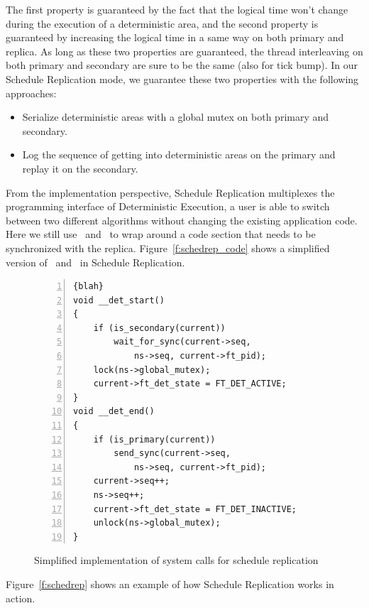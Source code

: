 The first property is guaranteed by the fact that the logical time won't change during the execution of a deterministic area, and the second property is guaranteed by increasing the logical time in a same way on both primary and replica. As long as these two properties are guaranteed, the thread interleaving on both primary and secondary are sure to be the same (also for tick bump). In our Schedule Replication mode, we guarantee these two properties with the following approaches:

\begin{itemize}
\item Serialize deterministic areas with a global mutex on both primary and secondary.
\item Log the sequence of getting into deterministic areas on the primary and replay it on the secondary.
\end{itemize}

From the implementation perspective, Schedule Replication multiplexes the programming interface of Deterministic Execution, a user is able to switch between two different algorithms without changing the existing application code. Here we still use \detstart\ and \detend\ to wrap around a code section that needs to be synchronized with the replica. Figure~\ref{f:schedrep_code} shows a simplified version of \detstart\ and \detend\ in Schedule Replication.

\begin{figure}
\begin{lstlisting}[numbers=left, frame=single, basicstyle=\small, breaklines]{blah}
void __det_start()
{
    if (is_secondary(current))
        wait_for_sync(current->seq, 
            ns->seq, current->ft_pid);
    lock(ns->global_mutex);
    current->ft_det_state = FT_DET_ACTIVE;
}
void __det_end()
{
    if (is_primary(current))
        send_sync(current->seq, 
            ns->seq, current->ft_pid);
    current->seq++;
    ns->seq++;
    current->ft_det_state = FT_DET_INACTIVE;
    unlock(ns->global_mutex);
}
\end{lstlisting}
\caption{Simplified implementation of system calls for schedule replication}
\label{f:schedrep_c}
\end{figure}

Figure~\ref{f:schedrep} shows an example of how Schedule Replication works in action.

